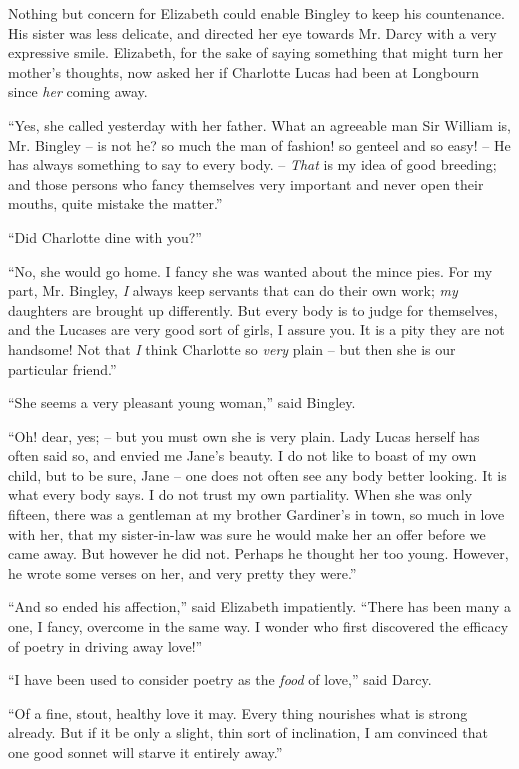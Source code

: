 Nothing but concern for Elizabeth could enable Bingley
to keep his countenance. His sister was less delicate, and
directed her eye towards Mr. Darcy with a very expressive
smile. Elizabeth, for the sake of saying something that
might turn her mother’s thoughts, now asked her if Charlotte
Lucas had been at Longbourn since \textit{her} coming away.

“Yes, she called yesterday with her father. What an
agreeable man Sir William is, Mr. Bingley -- is not he?
so much the man of fashion! so genteel and so easy! -- He
has always something to say to every body. -- \textit{That} is
my idea of good breeding; and those persons who fancy
themselves very important and never open their mouths,
quite mistake the matter.”

“Did Charlotte dine with you?”

“No, she would go home. I fancy she was wanted
about the mince pies. For my part, Mr. Bingley, \textit{I} always
keep servants that can do their own work; \textit{my} daughters
are brought up differently. But every body is to judge
for themselves, and the Lucases are very good sort of
girls, I assure you. It is a pity they are not handsome!
Not that \textit{I} think Charlotte so \textit{very} plain -- but then she is
our particular friend.”

“She seems a very pleasant young woman,” said
Bingley.

“Oh! dear, yes; -- but you must own she is very plain.
Lady Lucas herself has often said so, and envied me
Jane’s beauty. I do not like to boast of my own child,
but to be sure, Jane -- one does not often see any body
better looking. It is what every body says. I do not
trust my own partiality. When she was only fifteen,
there was a gentleman at my brother Gardiner’s in town,
so much in love with her, that my sister-in-law was sure
he would make her an offer before we came away. But
however he did not. Perhaps he thought her too young.
However, he wrote some verses on her, and very pretty
they were.”

“And so ended his affection,” said Elizabeth impatiently.
“There has been many a one, I fancy, overcome
in the same way. I wonder who first discovered
the efficacy of poetry in driving away love!”

“I have been used to consider poetry as the \textit{food} of
love,” said Darcy.

“Of a fine, stout, healthy love it may. Every thing
nourishes what is strong already. But if it be only a
slight, thin sort of inclination, I am convinced that one
good sonnet will starve it entirely away.”

